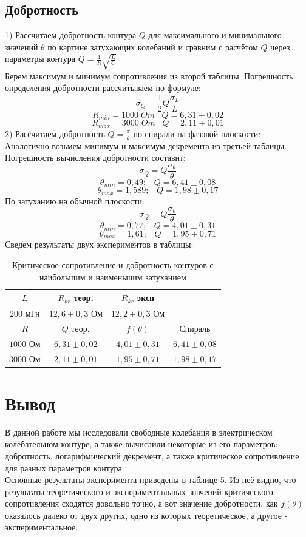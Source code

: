 \documentclass[11pt]{article}
\begin{document}
\subsection{Добротность}
1) Рассчитаем добротность контура $Q$ для максимального и минимального значений $\theta$ по картине затухающих колебаний и сравним с расчётом $Q$ через параметры контура $Q = \frac{1}{R}\sqrt{\frac{L}{C}}$\\
Берем максимум и минимум сопротивления из второй таблицы. Погрешность определения добротности рассчитываем по формуле:\\
$$\sigma_{Q} = \frac{1}{2}Q\frac{\sigma_{L}}{L}$$
$$ R_{min} = 1000 \; Om \; \; \; Q = 6,31 \pm 0,02$$
$$ R_{max} = 3000 \; Om \; \; \; Q = 2,11 \pm 0,01$$
2) Рассчитаем добротность $Q = \frac{\pi}{\theta}$ по спирали на фазовой плоскости: \\
Аналогично возьмем минимум и максимум декремента из третьей таблицы. Погрешность вычисления добротности составит:\\
$$\sigma_{Q} = Q\frac{\sigma_{\theta}}{\theta}$$
$$ \theta_{min} = 0,49;  \; \; \; Q = 6,41 \pm 0,08$$
$$ \theta_{max} = 1,589; \; \; \; Q = 1,98 \pm 0,17$$
По затуханию на обычной плоскости:\\
$$\sigma_{Q} = Q\frac{\sigma_{\theta}}{\theta}$$
$$ \theta_{min} = 0,77;  \; \; \; Q = 4,01 \pm 0,31$$
$$ \theta_{max} = 1,61; \; \; \; Q = 1,95 \pm 0,71$$
Сведем результаты двух экспериментов в таблицы:\\
\begin{table}[h]
\centering
\begin{tabular}{|c|c|c|c|}
\hline
$L$ & $R_{kr}$ теор. & $R_{kr}$ эксп & \\ \hline
$200$ мГн &$12,6 \pm 0,3$ Ом & $12,2 \pm 0,3$ Ом & \\ \hline
$R$ & $Q$ теор. & $f(\theta)$ & Спираль\\ \hline
$1000$ Ом & $6,31 \pm 0,02$ &$4,01 \pm 0,31$ & $6,41 \pm 0,08$ \\ \hline
$3000$ Ом & $2,11 \pm 0,01$ & $1,95 \pm 0,71$ & $1,98 \pm 0,17$ \\ \hline
\end{tabular}
\caption{Критическое сопротивление и добротность контуров с наибольшим и наименьшим затуханием}
\end{table}
\section{Вывод}
В данной работе мы исследовали свободные колебания в электрическом колебательном контуре, а также вычислили некоторые из его параметров: добротность, логарифмический декремент, а также критическое сопротивление для разных параметров контура.\\
Основные результаты эксперимента приведены в таблице 5. Из неё видно, что результаты теоретического и экспериментальных значений критического сопротивления сходятся довольно точно, а вот значение добротности, как $f(\theta)$ оказалось далеко от двух других, одно из которых теоретическое, а другое - экспериментальное. \\
\end{document}
